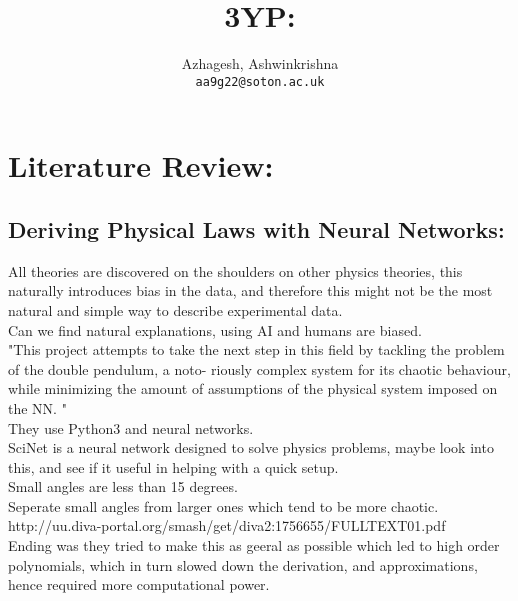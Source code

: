 \documentclass [12pt]{article}
\title{3YP:}
\author{
	Azhagesh, Ashwinkrishna\\
	\texttt{aa9g22@soton.ac.uk}
}
\begin{document}
\maketitle 

\section{Literature Review: }

\subsection{Deriving Physical Laws with Neural Networks: }

All theories are discovered on the shoulders on other physics theories, this naturally introduces bias in the data, and therefore 
this might not be the most natural and simple way to describe experimental data.\\ 

Can we find natural explanations, using AI and humans are biased.\\ 

"This project attempts to take the next step in this field by tackling the problem of the double pendulum, a noto-
riously complex system for its chaotic behaviour, while minimizing the amount of assumptions of the physical
system imposed on the NN. "\\

They use Python3 and neural networks.\\ 

SciNet is a neural network designed to solve physics problems, maybe look into this, and see if it useful in helping with a quick setup.\\ 

Small angles are less than 15 degrees.\\ 

Seperate small angles from larger ones which tend to be more chaotic.\\ 

http://uu.diva-portal.org/smash/get/diva2:1756655/FULLTEXT01.pdf\\ 

Ending was they tried to make this as geeral as possible which led to high order polynomials, which in turn slowed down the derivation, and approximations, hence required more computational power.\\ 
\end{document}
